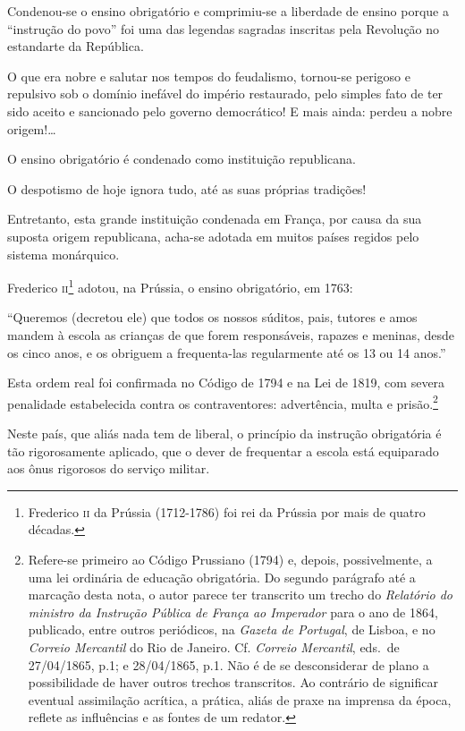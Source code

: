 Condenou-se o ensino obrigatório e comprimiu-se a liberdade de ensino
porque a ``instrução do povo'' foi uma das legendas sagradas inscritas
pela Revolução no estandarte da República.

O que era nobre e salutar nos tempos do feudalismo, tornou-se perigoso e
repulsivo sob o domínio inefável do império restaurado, pelo simples
fato de ter sido aceito e sancionado pelo governo democrático! E mais
ainda: perdeu a nobre origem!\ldots{}

O ensino obrigatório é condenado como instituição republicana.

O despotismo de hoje ignora tudo, até as suas próprias tradições!

Entretanto, esta grande instituição condenada em França, por causa da
sua suposta origem republicana, acha-se adotada em muitos países regidos
pelo sistema monárquico.

Frederico \textsc{ii}\footnote{Frederico \textsc{ii} da Prússia (1712-1786) foi rei da
  Prússia por mais de quatro décadas.} adotou, na Prússia, o ensino
obrigatório, em 1763:

``Queremos (decretou ele) que todos os nossos súditos, pais, tutores e
amos mandem à escola as crianças de que forem responsáveis, rapazes e
meninas, desde os cinco anos, e os obriguem a frequenta-las regularmente
até os 13 ou 14 anos.''

Esta ordem real foi confirmada no Código de 1794 e na Lei de 1819, com
severa penalidade estabelecida contra os contraventores: advertência,
multa e prisão.\footnote{Refere-se primeiro ao Código Prussiano (1794)
  e, depois, possivelmente, a uma lei ordinária de educação obrigatória.
  Do segundo parágrafo até a marcação desta nota, o autor parece ter
  transcrito um trecho do \emph{Relatório do ministro da Instrução
  Pública de França ao Imperador} para o ano de 1864, publicado, entre
  outros periódicos, na \emph{Gazeta de Portugal}, de Lisboa, e no
  \emph{Correio Mercantil} do Rio de Janeiro. Cf. \emph{Correio
  Mercantil}, eds.~de 27/04/1865, p.1; e 28/04/1865, p.1. Não é de se
  desconsiderar de plano a possibilidade de haver outros trechos
  transcritos. Ao contrário de significar eventual assimilação acrítica,
  a prática, aliás de praxe na imprensa da época, reflete as influências
  e as fontes de um redator.}

Neste país, que aliás nada tem de liberal, o princípio da instrução
obrigatória é tão rigorosamente aplicado, que o dever de frequentar a
escola está equiparado aos ônus rigorosos do serviço militar.

